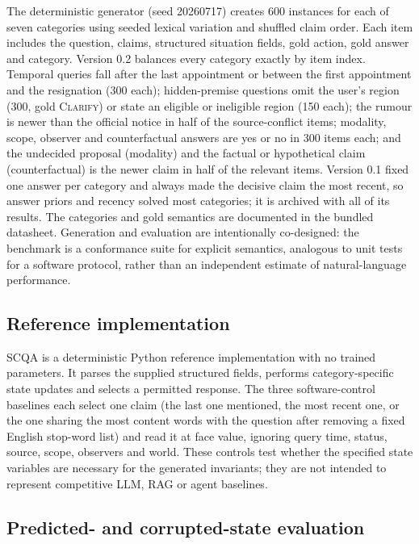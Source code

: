 The deterministic generator (seed 20260717) creates 600 instances for each of
seven categories using seeded lexical variation and shuffled claim order. Each
item includes the question, claims, structured situation fields, gold action,
gold answer and category. Version 0.2 balances every category exactly by item
index. Temporal queries fall after the last appointment or between the first
appointment and the resignation (300 each); hidden-premise questions omit the
user's region (300, gold \textsc{Clarify}) or state an eligible or ineligible
region (150 each); the rumour is newer than the official notice in half of the
source-conflict items; modality, scope, observer and counterfactual answers are
yes or no in 300 items each; and the undecided proposal (modality) and the
factual or hypothetical claim (counterfactual) is the newer claim in half of
the relevant items. Version 0.1 fixed one answer per category and always made
the decisive claim the most recent, so answer priors and recency solved most
categories; it is archived with all of its results. The categories and gold semantics are documented in the bundled
datasheet. Generation and evaluation are intentionally co-designed: the
benchmark is a conformance suite for explicit semantics, analogous to unit tests
for a software protocol, rather than an independent estimate of natural-language
performance.

\subsection*{Reference implementation}

SCQA is a deterministic Python reference implementation with no trained
parameters. It parses the supplied structured fields, performs category-specific
state updates and selects a permitted response. The three software-control
baselines each select one claim (the last one mentioned, the most recent one, or
the one sharing the most content words with the question after removing a fixed
English stop-word list) and read it at face value, ignoring query time, status,
source, scope, observers and world. These controls test whether the
specified state variables are necessary for the generated invariants; they are
not intended to represent competitive LLM, RAG or agent baselines.

\subsection*{Predicted- and corrupted-state evaluation}

